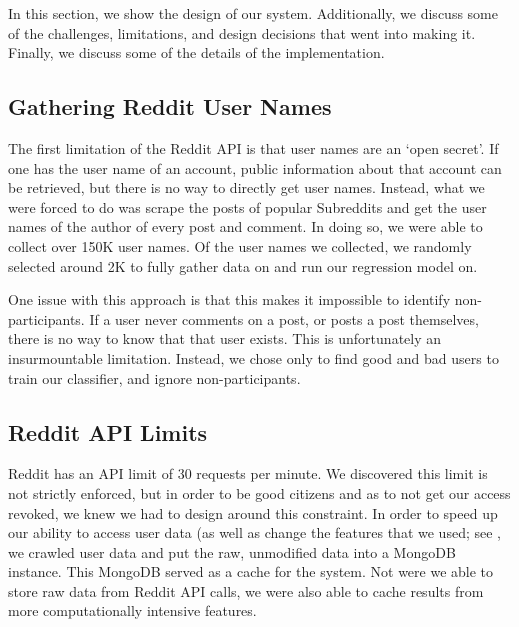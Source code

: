 In this section, we show the design of our system. Additionally, we discuss some
of the challenges, limitations, and design decisions that went into making it.
Finally, we discuss some of the details of the implementation.

\subsection{Gathering Reddit User Names} %
\label{sub:gathering_reddit_user_names}

The first limitation of the Reddit API is that user names are an `open secret'.
If one has the user name of an account, public information about that account
can be retrieved, but there is no way to directly get user names. Instead, what
we were forced to do was scrape the posts of popular Subreddits and get the user
names of the author of every post and comment. In doing so, we were able to
collect over 150K user names. Of the user names we collected, we randomly
selected around 2K to fully gather data on and run our regression model on.

One issue with this approach is that this makes it impossible to identify non-
participants. If a user never comments on a post, or posts a post themselves,
there is no way to know that that user exists. This is unfortunately an
insurmountable limitation. Instead, we chose only to find good and bad users to
train our classifier, and ignore non-participants.


\subsection{Reddit API Limits} %
\label{sub:reddit_api_limits}

Reddit has an API limit of 30 requests per minute. We discovered this limit is
not strictly enforced, but in order to be good citizens and as to not get our
access revoked, we knew we had to design around this constraint. In order to
speed up our ability to access user data (as well as change the features that we
used; see , we crawled user data and put the
raw, unmodified data into a MongoDB instance. This MongoDB served as a cache for
the system. Not were we able to store raw data from Reddit API calls, we were
also able to cache results from more computationally intensive features.


